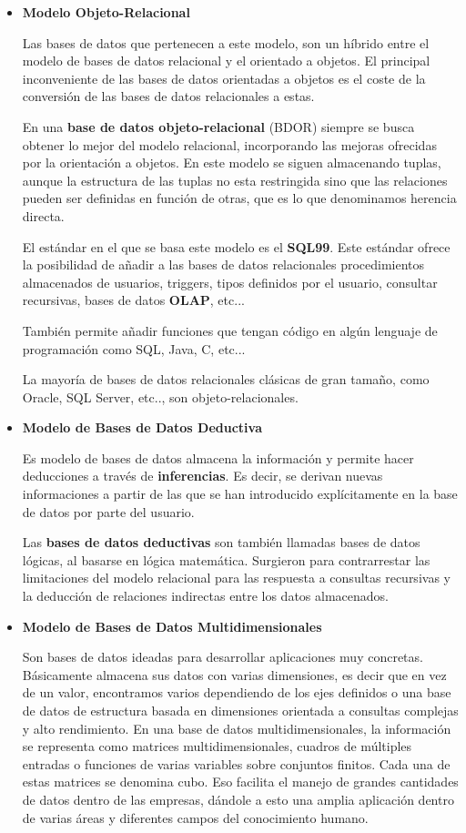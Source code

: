 \begin{itemize}
    \item \textbf{Modelo Objeto-Relacional}

    Las bases de datos que pertenecen a este modelo, son un híbrido entre el modelo de bases de datos relacional y el orientado a objetos. El principal inconveniente de las bases de datos orientadas a objetos es el coste de la conversión de las bases de datos relacionales a estas.

    En una \textbf{base de datos objeto-relacional} (BDOR) siempre se busca obtener lo mejor del modelo relacional, incorporando las mejoras ofrecidas por la orientación a objetos. En este modelo se siguen almacenando tuplas, aunque la estructura de las tuplas no esta restringida sino que las relaciones pueden ser definidas en función de otras,  que es lo que denominamos herencia directa.

    El estándar en el que se basa este modelo es el \textbf{\gls{SQL99}}. Este estándar ofrece la posibilidad de añadir a las bases de datos relacionales procedimientos almacenados de usuarios, triggers, tipos definidos por el usuario, consultar recursivas, bases de datos \textbf{\gls{OLAP}}, etc...

    También permite añadir funciones que tengan código en algún lenguaje de programación como SQL, Java, C, etc...

    La mayoría de bases de datos relacionales clásicas de gran tamaño, como Oracle, SQL Server, etc.., son objeto-relacionales.


    \item \textbf{Modelo de Bases de Datos Deductiva}

    Es modelo de bases de datos almacena la información y permite hacer deducciones a través de \textbf{inferencias}. Es decir, se derivan nuevas informaciones a partir de las que se han introducido explícitamente en la base de datos por parte del usuario.

    Las \textbf{bases de datos deductivas} son también llamadas bases de datos lógicas, al basarse en lógica matemática. Surgieron para contrarrestar las limitaciones del modelo relacional para las respuesta a consultas recursivas y la deducción de relaciones indirectas entre los datos almacenados.

    \item \textbf{Modelo de Bases de Datos Multidimensionales}

    Son bases de datos ideadas para desarrollar aplicaciones muy concretas. Básicamente almacena sus datos con varias dimensiones, es decir que en vez de un valor, encontramos varios dependiendo de los ejes definidos o una base de datos de estructura basada en dimensiones orientada a consultas complejas y alto rendimiento. En una base de datos multidimensionales, la información se representa como matrices multidimensionales, cuadros de múltiples entradas o funciones de varias variables sobre conjuntos finitos. Cada una de estas matrices se denomina cubo. Eso facilita el manejo de grandes cantidades de datos dentro de las empresas, dándole a esto una amplia aplicación dentro de varias áreas y diferentes campos del conocimiento humano.


\end{itemize}
